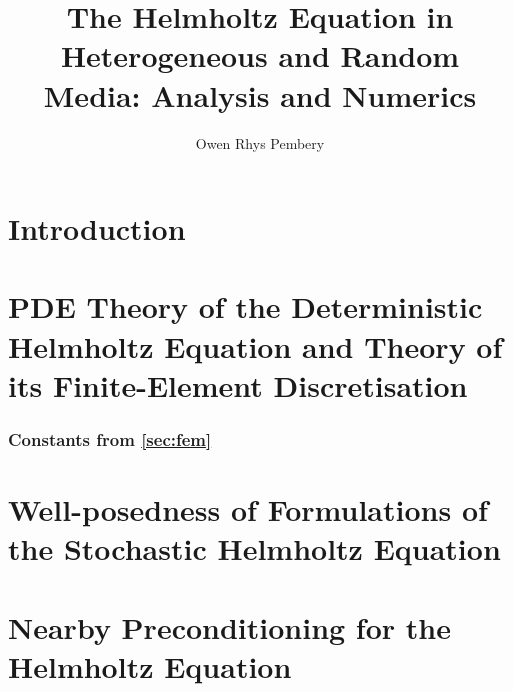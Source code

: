\documentclass[draft]{book}
\title{The Helmholtz Equation in Heterogeneous and Random Media: Analysis and Numerics}
\author{Owen Rhys Pembery}
\begin{document}
\maketitle



\tableofcontents

\listoffigures
\listoftables
\listofalgorithms

\chapter{Introduction}\label{chap:intro}


\chapter{PDE Theory of the Deterministic Helmholtz Equation and Theory of its Finite-Element Discretisation}\label{chap:background}




\subsection{Constants from \cref{sec:fem}}\label{app:constants}


%

%

\chapter{Well-posedness of Formulations of the Stochastic Helmholtz Equation}\label{chap:stochastic}
 
















\chapter{Nearby Preconditioning for the Helmholtz Equation}\label{chap:nbpc}

\end{document}
